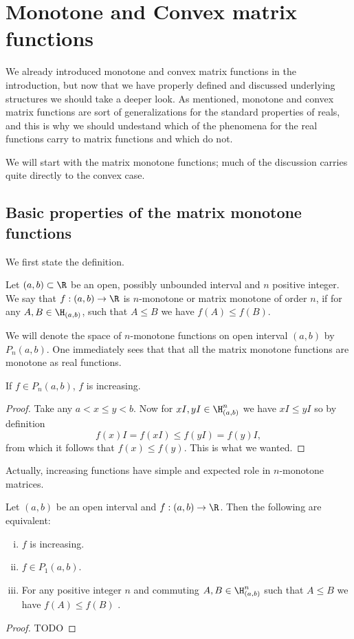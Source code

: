 \chapter{Monotone and Convex matrix functions}

We already introduced monotone and convex matrix functions in the introduction, but now that we have properly defined and discussed underlying structures we should take a deeper look. As mentioned, monotone and convex matrix functions are sort of generalizations for the standard properties of reals, and this is why we should undestand which of the phenomena for the real functions carry to matrix functions and which do not.

We will start with the matrix monotone functions; much of the discussion carries quite directly to the convex case.

\section{Basic properties of the matrix monotone functions}

We first state the definition.

\begin{maar}
	Let $(a,b) \subset \R$ be an open, possibly unbounded interval and $n$ positive integer. We say that $f : (a, b) \to \R$ is $n$-monotone or matrix monotone of order $n$, if for any $A, B \in \H_{(a, b)}$, such that $A \leq B$ we have $f(A) \leq f(B)$.
\end{maar}

We will denote the space of $n$-monotone functions on open interval $(a, b)$ by $P_{n}(a, b)$. One immediately sees that that all the matrix monotone functions are monotone as real functions.

\begin{prop}
	If $f \in P_{n}(a, b)$, $f$ is increasing.
\end{prop}
\begin{proof}
	Take any $a < x \leq y < b$. Now for $xI, yI \in \H^{n}_{(a, b)}$ we have $x I \leq y I$ so by definition
	\[
		f(x) I = f(xI) \leq f(y I) = f(y) I,
	\]
	from which it follows that $f(x) \leq f(y)$. This is what we wanted.
\end{proof}

Actually, increasing functions have simple and expected role in $n$-monotone matrices.

\begin{prop}
	Let $(a, b)$ be an open interval and $f : (a, b) \to \R$. Then the following are equivalent:
	\begin{enumerate}[(i)]
		\item $f$ is increasing.
		\item $f \in P_{1}(a, b)$.
		\item For any positive integer $n$ and commuting $A, B \in \H^{n}_{(a, b)}$ such that $A \leq B$ we have $f(A) \leq f(B)$ .
	\end{enumerate}
\end{prop}
\begin{proof}
	TODO
\end{proof}

